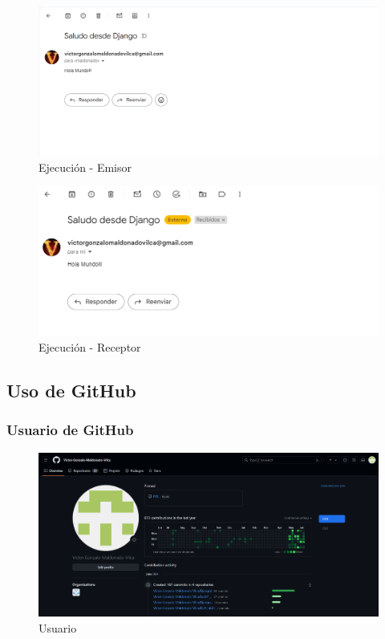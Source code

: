\documentclass{article}
\begin{document}
\begin{itemize}
\begin{figure}[H]
            \includegraphics[width=1\textwidth, keepaspectratio]{img/ejecucion5.png}
            \caption{Ejecución - Emisor}
          \end{figure}
          \begin{figure}[H]
            \centering
            \includegraphics[width=1\textwidth, keepaspectratio]{img/ejecucion6.png}
            \caption{Ejecución - Receptor}
          \end{figure}
      \end{itemize}

	
  \subsection{Uso de GitHub}
  

	\subsubsection{Usuario de GitHub}
    \begin{figure}[H]
      \centering
      \includegraphics[width=1\textwidth, keepaspectratio]{img/usuario.png}
      \caption{Usuario}
    \end{figure}
  
\end{document}
